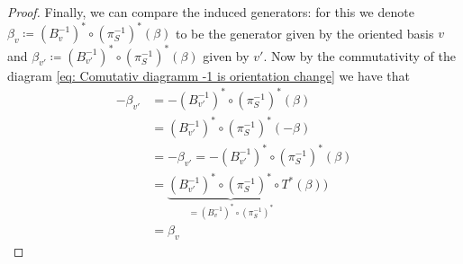 \begin{proof}
Finally, we can compare the induced generators: for this we denote $\beta_v\coloneq (B_{v}^{-1})^*\circ (\pi^{-1}_S)^*(\beta)$ to be the generator given by the oriented basis $v$ and $\beta_{v'}\coloneq (B_{v'}^{-1})^*\circ (\pi^{-1}_S)^*(\beta)$ given by $v'$. Now by the commutativity of the diagram \ref{eq: Comutativ diagramm -1 is orientation change} we have that 
\begin{align*}
    -\beta_{v'} 
    &= -(B_{v'}^{-1})^*\circ (\pi^{-1}_S)^*(\beta) \\
    &= (B_{v'}^{-1})^*\circ (\pi^{-1}_S)^*(-\beta)\\
    &= -\beta_{v'}=-(B_{v'}^{-1})^*\circ (\pi^{-1}_S)^*(\beta)\\
    &= \underbrace{(B_{v'}^{-1})^*\circ (\pi^{-1}_S)^*\circ T^*}_{=(B_{v}^{-1})^*\circ (\pi^{-1}_S)^*}(\beta))\\
    &= \beta_v
\end{align*}
\end{proof}
